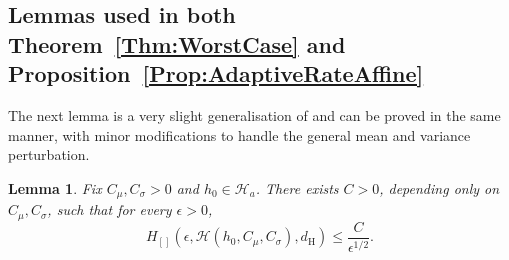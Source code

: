 \documentclass[a4paper,12pt]{article}
\newtheorem{lemma}[theorem]{Lemma}
\begin{document}
\subsection{Lemmas used in both Theorem~\ref{Thm:WorstCase} and Proposition~\ref{Prop:AdaptiveRateAffine}}
\label{Sec:BracketExtremeEvent}

The next lemma is a very slight generalisation of \cite[][Theorem~4]{kim2016global} and can be proved in the same manner, with  minor modifications to handle the general mean and variance perturbation.
\begin{lemma} \citet[][Theorem 4]{kim2016global}
  \label{Prop:NonlocalBracketingEntropy}
Fix $C_\mu, C_\sigma > 0$ and $h_0 \in \mathcal{H}_a$.  There exists $C > 0$, depending only on $C_\mu, C_\sigma$, such that for every $\epsilon > 0$,
  \[
    H_{[]}( \epsilon, \mathcal{H}(h_0, C_\mu, C_{\sigma}), d_{\mathrm{H}}) \leq \frac{C}{\epsilon^{1/2}}.
  \]
\end{lemma}
\end{document}
